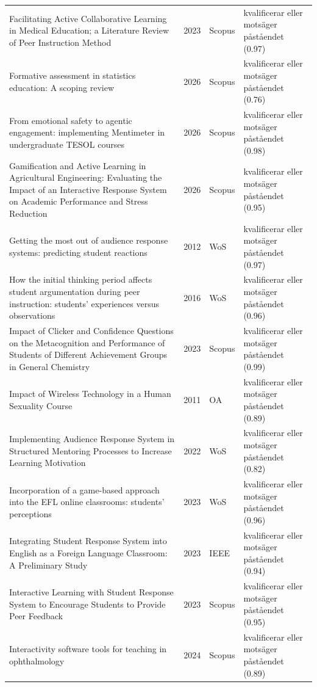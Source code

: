 \begin{longtable}{@{}%
  >{\raggedright\arraybackslash}p{}c%
  >{\raggedright\arraybackslash}p{}%
  >{\raggedright\arraybackslash}p{}@{}}
Facilitating Active Collaborative Learning in Medical Education; a Literature Review of Peer Instruction Method & 2023 & Scopus & kvalificerar eller motsäger påståendet (0.97) \\
Formative assessment in statistics education: A scoping review & 2026 & Scopus & kvalificerar eller motsäger påståendet (0.76) \\
From emotional safety to agentic engagement: implementing Mentimeter in undergraduate TESOL courses & 2026 & Scopus & kvalificerar eller motsäger påståendet (0.98) \\
Gamification and Active Learning in Agricultural Engineering: Evaluating the Impact of an Interactive Response System on Academic Performance and Stress Reduction & 2026 & Scopus & kvalificerar eller motsäger påståendet (0.95) \\
Getting the most out of audience response systems: predicting student reactions & 2012 & WoS & kvalificerar eller motsäger påståendet (0.97) \\
How the initial thinking period affects student argumentation during peer instruction: students' experiences versus observations & 2016 & WoS & kvalificerar eller motsäger påståendet (0.96) \\
Impact of Clicker and Confidence Questions on the Metacognition and Performance of Students of Different Achievement Groups in General Chemistry & 2023 & Scopus & kvalificerar eller motsäger påståendet (0.99) \\
Impact of Wireless Technology in a Human Sexuality Course & 2011 & OA & kvalificerar eller motsäger påståendet (0.89) \\
Implementing Audience Response System in Structured Mentoring Processes to Increase Learning Motivation & 2022 & WoS & kvalificerar eller motsäger påståendet (0.82) \\
Incorporation of a game-based approach into the EFL online classrooms: students' perceptions & 2023 & WoS & kvalificerar eller motsäger påståendet (0.96) \\
Integrating Student Response System into English as a Foreign Language Classroom: A Preliminary Study & 2023 & IEEE & kvalificerar eller motsäger påståendet (0.94) \\
Interactive Learning with Student Response System to Encourage Students to Provide Peer Feedback & 2023 & Scopus & kvalificerar eller motsäger påståendet (0.95) \\
Interactivity software tools for teaching in ophthalmology & 2024 & Scopus & kvalificerar eller motsäger påståendet (0.89) \\

\end{longtable}

